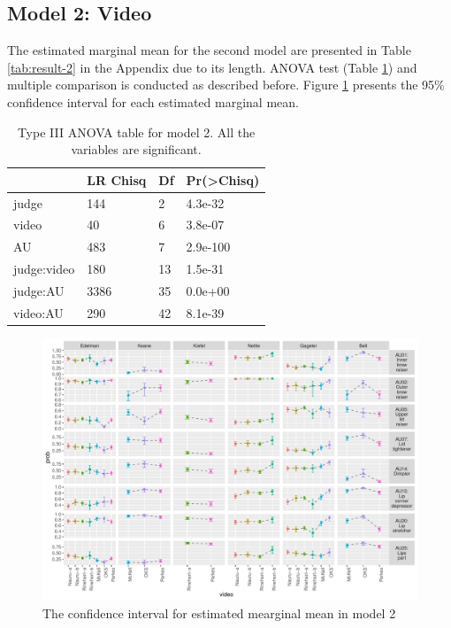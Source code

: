 \documentclass{monashthesis}
\begin{document}
\hypertarget{model-2-video-1}{%
\subsection{Model 2: Video}\label{model-2-video-1}}

The estimated marginal mean for the second model are presented in Table \ref{tab:result-2} in the Appendix due to its length. ANOVA test (Table \ref{tab:anova-2}) and multiple comparison is conducted as described before. Figure \ref{fig:model2-plot} presents the 95\% confidence interval for each estimated marginal mean.

\begin{table}

\caption{\label{tab:anova-2}\label{tab:anova-2}Type III ANOVA table for model 2. All the variables are significant.}
\centering
\begin{tabular}[t]{l|l|l|l}
\hline
  & LR Chisq & Df & Pr(>Chisq)\\
\hline
judge & 144 & 2 & 4.3e-32\\
\hline
video & 40 & 6 & 3.8e-07\\
\hline
AU & 483 & 7 & 2.9e-100\\
\hline
judge:video & 180 & 13 & 1.5e-31\\
\hline
judge:AU & 3386 & 35 & 0.0e+00\\
\hline
video:AU & 290 & 42 & 8.1e-39\\
\hline
\end{tabular}
\end{table}

\begin{figure}

{\centering \includegraphics[width=1\linewidth]{figures/model2-plot-1} 

}

\caption{The confidence interval for estimated mearginal mean in model 2}\label{fig:model2-plot}
\end{figure}
\end{document}
